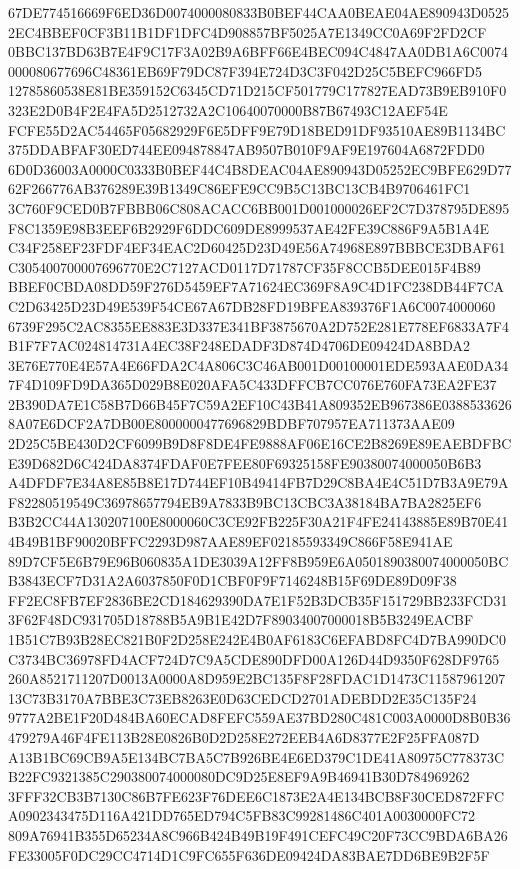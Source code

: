 \documentclass[UTF8,fontset=fandol,zihao=-4,a4paper]{ctexart}
\begin{document}
{{67DE774516669F6ED36D0074000080833B0BEF44CAA0BEAE04AE890943D05252EC4BBEF0CF3B11B1DF1DFC4D908857BF5025A7E1349CC0A69F2FD2CF
0BBC137BD63B7E4F9C17F3A02B9A6BFF66E4BEC094C4847AA0DB1A6C0074000080677696C48361EB69F79DC87F394E724D3C3F042D25C5BEFC966FD5
12785860538E81BE359152C6345CD71D215CF501779C177827EAD73B9EB910F0323E2D0B4F2E4FA5D2512732A2C10640070000B87B67493C12AEF54E
FCFE55D2AC54465F05682929F6E5DFF9E79D18BED91DF93510AE89B1134BC375DDABFAF30ED744EE094878847AB9507B010F9AF9E197604A6872FDD0
6D0D36003A0000C0333B0BEF44C4B8DEAC04AE890943D05252EC9BFE629D7762F266776AB376289E39B1349C86EFE9CC9B5C13BC13CB4B9706461FC1
3C760F9CED0B7FBBB06C808ACACC6BB001D001000026EF2C7D378795DE895F8C1359E98B3EEF6B2929F6DDC609DE8999537AE42FE39C886F9A5B1A4E
C34F258EF23FDF4EF34EAC2D60425D23D49E56A74968E897BBBCE3DBAF61C305400700007696770E2C7127ACD0117D71787CF35F8CCB5DEE015F4B89
BBEF0CBDA08DD59F276D5459EF7A71624EC369F8A9C4D1FC238DB44F7CAC2D63425D23D49E539F54CE67A67DB28FD19BFEA839376F1A6C0074000060
6739F295C2AC8355EE883E3D337E341BF3875670A2D752E281E778EF6833A7F4B1F7F7AC024814731A4EC38F248EDADF3D874D4706DE09424DA8BDA2
3E76E770E4E57A4E66FDA2C4A806C3C46AB001D00100001EDE593AAE0DA347F4D109FD9DA365D029B8E020AFA5C433DFFCB7CC076E760FA73EA2FE37
2B390DA7E1C58B7D66B45F7C59A2EF10C43B41A809352EB967386E03885336268A07E6DCF2A7DB00E8000000477696829BDBF707957EA711373AAE09
2D25C5BE430D2CF6099B9D8F8DE4FE9888AF06E16CE2B8269E89EAEBDFBCE39D682D6C424DA8374FDAF0E7FEE80F69325158FE90380074000050B6B3
A4DFDF7E34A8E85B8E17D744EF10B49414FB7D29C8BA4E4C51D7B3A9E79AF82280519549C36978657794EB9A7833B9BC13CBC3A38184BA7BA2825EF6
B3B2CC44A130207100E8000060C3CE92FB225F30A21F4FE24143885E89B70E414B49B1BF90020BFFC2293D987AAE89EF02185593349C866F58E941AE
89D7CF5E6B79E96B060835A1DE3039A12FF8B959E6A0501890380074000050BCB3843ECF7D31A2A6037850F0D1CBF0F9F7146248B15F69DE89D09F38
FF2EC8FB7EF2836BE2CD184629390DA7E1F52B3DCB35F151729BB233FCD313F62F48DC931705D18788B5A9B1E42D7F89034007000018B5B3249EACBF
1B51C7B93B28EC821B0F2D258E242E4B0AF6183C6EFABD8FC4D7BA990DC0C3734BC36978FD4ACF724D7C9A5CDE890DFD00A126D44D9350F628DF9765
260A8521711207D0013A0000A8D959E2BC135F8F28FDAC1D1473C1158796120713C73B3170A7BBE3C73EB8263E0D63CEDCD2701ADEBDD2E35C135F24
9777A2BE1F20D484BA60ECAD8FEFC559AE37BD280C481C003A0000D8B0B36479279A46F4FE113B28E0826B0D2D258E272EEB4A6D8377E2F25FFA087D
A13B1BC69CB9A5E134BC7BA5C7B926BE4E6ED379C1DE41A80975C778373CB22FC9321385C290380074000080DC9D25E8EF9A9B46941B30D784969262
3FFF32CB3B7130C86B7FE623F76DEE6C1873E2A4E134BCB8F30CED872FFCA0902343475D116A421DD765ED794C5FB83C99281486C401A0030000FC72
809A76941B355D65234A8C966B424B49B19F491CEFC49C20F73CC9BDA6BA26FE33005F0DC29CC4714D1C9FC655F636DE09424DA83BAE7DD6BE9B2F5F
}}
\end{document}
